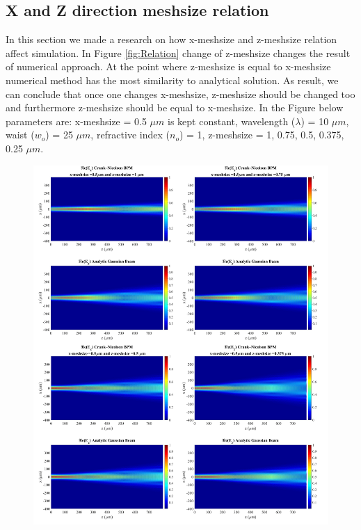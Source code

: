 \documentclass[a4paper]{article}
\begin{document}
	\subsection{X and Z direction meshsize relation}
	In this section we made a research on how x-meshsize and z-meshsize relation affect simulation. In Figure \ref{fig:Relation} change of z-meshsize changes the result of numerical approach. At the point where z-meshsize is equal to x-meshsize numerical method has the most similarity to analytical solution. As result, we can conclude that once one changes x-meshsize, z-meshsize should be changed too and furthermore z-meshsize should be equal to x-meshsize. In the Figure below parameters are: x-meshsize  = 0.5 $\mu m$ is kept constant, wavelength ($\lambda$) = 10 $\mu m$, waist ($w_o$) = 25 $\mu m$, refractive index ($n_o$) = 1, z-meshsize = 1, 0.75, 0.5, 0.375, 0.25 $\mu m$.
%	
	\begin{figure}[H]
		\hspace{-22.5mm}
		\includegraphics[width=1.35\textwidth]{change1234.jpg}	
	\end{figure}
	
\end{document}
